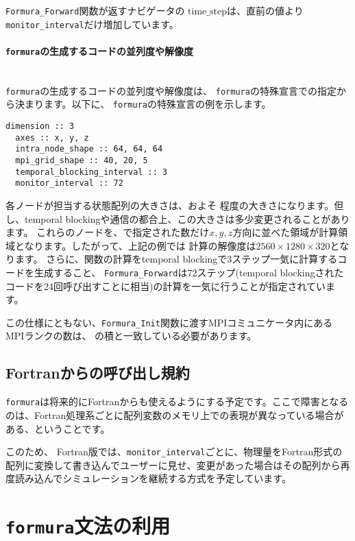 \documentclass{jsarticle}
\newcommand{\formura}{{\texttt{formura}}}
\begin{document}
 \verb`Formura_Forward`関数が返すナビゲータの
 $\mathrm{time\_step}$は、直前の値より
\verb`monitor_interval`だけ増加しています。

\paragraph{\formura の生成するコードの並列度や解像度} \leavevmode\\

\formura の生成するコードの並列度や解像度は、
\formura の特殊宣言での指定から決まります。以下に、
\formura の特殊宣言の例を示します。

\begin{lstlisting}[mathescape]
  dimension :: 3
  axes :: x, y, z
  intra_node_shape :: 64, 64, 64
  mpi_grid_shape :: 40, 20, 5
  temporal_blocking_interval :: 3
  monitor_interval :: 72
\end{lstlisting}

各ノードが担当する状態配列の大きさは、およそ
程度の大きさになります。但し、temporal blockingや通信の都合上、この大きさは多少変更されることがあります。
これらのノードを、で指定された数だけ$x,y,z$方向に並べた領域が計算領域となります。したがって、上記の例では
計算の解像度は$2560 \times 1280 \times 320$となります。
さらに、関数の計算をtemporal blockingで3ステップ一気に計算するコードを生成すること、
\verb`Formura_Forward`は72ステップ(temporal blockingされたコードを24回呼び出すことに相当)の計算を一気に行うことが指定されています。

この仕様にともない、\verb`Formura_Init`関数に渡すMPIコミュニケータ内にあるMPIランクの数は、
の積と一致している必要があります。


\subsection{Fortranからの呼び出し規約}

\formura は将来的にFortranからも使えるようにする予定です。ここで障害となるのは、Fortran処理系ごとに配列変数のメモリ上での表現が異なっている場合がある、ということです。

このため、
Fortran版では、\verb`monitor_interval`ごとに、物理量をFortran形式の配列に変換して書き込んでユーザーに見せ、変更があった場合はその配列から再度読み込んでシミュレーションを継続する方式を予定しています。

\newpage
\section{\formura 文法の利用}
\end{document}
